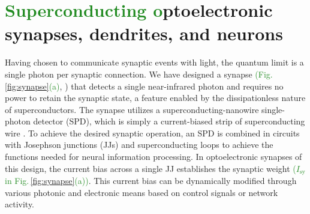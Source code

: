 \documentclass[twocolumn]{article}
\begin{document}
\section{\label{sec:synapses_dendrites_neurons}\textcolor{ForestGreen}{Superconducting o}ptoelectronic synapses, dendrites, and neurons}
Having chosen to communicate synaptic events with light, the quantum limit is a single photon per synaptic connection. We have designed a synapse \textcolor{ForestGreen}{(Fig.\,\ref{fig:synapse}(a)}, \cite{sh2018,sh2019,sh2020}) that detects a single near-infrared photon and requires no power to retain the synaptic state, a feature enabled by the dissipationless nature of superconductors. The synapse utilizes a superconducting-nanowire single-photon detector (SPD), which is simply a current-biased strip of superconducting wire \cite{mave2013}. To achieve the desired synaptic operation, an SPD is combined in circuits with Josephson junctions (JJs) and superconducting loops to achieve the functions needed for neural information processing. In optoelectronic synapses of this design, the current bias across a single JJ establishes the synaptic weight \textcolor{ForestGreen}{($I_{\mathrm{sy}}$ in Fig.\,\ref{fig:synapse}(a))}. This current bias can be dynamically modified through various photonic and electronic means based on control signals or network activity. 
\end{document}
